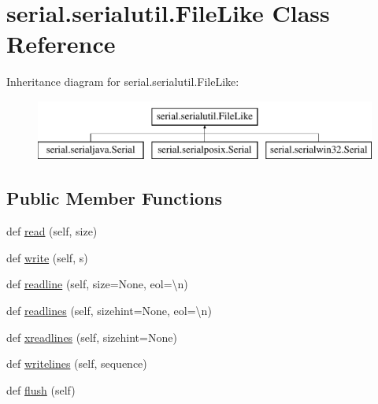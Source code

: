\hypertarget{classserial_1_1serialutil_1_1_file_like}{}\section{serial.\+serialutil.\+File\+Like Class Reference}
\label{classserial_1_1serialutil_1_1_file_like}
Inheritance diagram for serial.\+serialutil.\+File\+Like\+:\begin{figure}[H]
\begin{center}
\leavevmode
\includegraphics[height=2.000000cm]{classserial_1_1serialutil_1_1_file_like}
\end{center}
\end{figure}
\subsection*{Public Member Functions}
\begin{DoxyCompactItemize}
\item 
def \hyperlink{classserial_1_1serialutil_1_1_file_like_a1faeb6864266ba88ebe0b1cd5fd62695}{read} (self, size)
\item 
def \hyperlink{classserial_1_1serialutil_1_1_file_like_a9d78cfc132ec59f4d9943885b8cb6994}{write} (self, s)
\item 
def \hyperlink{classserial_1_1serialutil_1_1_file_like_a7319f0162be681c3de1e24ac0fbf404a}{readline} (self, size=None, eol=\textquotesingle{}\textbackslash{}n\textquotesingle{})
\item 
def \hyperlink{classserial_1_1serialutil_1_1_file_like_a79ae263cffa7c39432875e3d5eee75cc}{readlines} (self, sizehint=None, eol=\textquotesingle{}\textbackslash{}n\textquotesingle{})
\item 
def \hyperlink{classserial_1_1serialutil_1_1_file_like_a806cd4a16c16967e47cd7f7983cb2c0a}{xreadlines} (self, sizehint=None)
\item 
def \hyperlink{classserial_1_1serialutil_1_1_file_like_a7e8df1c62004218687140d4945e72795}{writelines} (self, sequence)
\item 
def \hyperlink{classserial_1_1serialutil_1_1_file_like_aa2858cb9b63a1815d5a62a2624b6151f}{flush} (self)
\end{DoxyCompactItemize}


